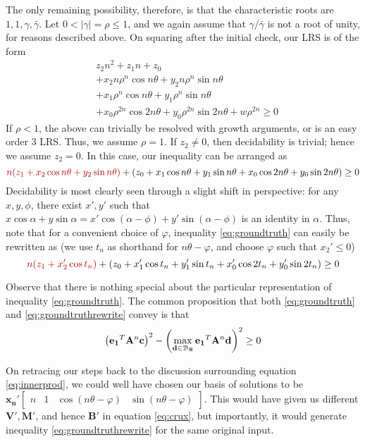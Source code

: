 The only remaining possibility, therefore, is that the characteristic roots are $1, 1, \gamma, \bar{\gamma}$. Let $0 < |\gamma| = \rho \le 1$, and we again assume that $\gamma/\bar{\gamma}$ is not a root of unity, for reasons described above. On squaring after the initial check, our LRS is of the form
\begin{align*}
&z_2n^2 + z_1n + z_0  \\
&+ x_2 n \rho^n \cos n\theta + y_2 n \rho^n \sin n\theta  \\
&+ x_1\rho^n\cos n\theta + y_1\rho^n\sin n\theta  \\
&+ x_0 \rho^{2n}\cos 2n\theta + y_0 \rho^{2n} \sin 2n\theta + w\rho^{2n} \ge 0
\end{align*}
If $\rho < 1$, the above can trivially be resolved with growth arguments, or is an easy order $3$ LRS. Thus, we assume $\rho = 1$. If $z_2 \ne 0$, then decidability is trivial; hence we assume $z_2 = 0$. In this case, our inequality can be arranged as
\begin{equation}
\label{eq:groundtruth}
{\color{red!70!black} n(z_1 + x_2\cos n\theta + y_2\sin n\theta)} + (z_0 + x_1\cos n\theta + y_1\sin n\theta + x_0\cos 2n\theta + y_0\sin 2n\theta) \ge 0
\end{equation}
Decidability is most clearly seen through a slight shift in perspective: for any $x, y, \phi$, there exist $x', y'$ such that $x\cos \alpha + y\sin\alpha = x'\cos(\alpha - \phi) + y'\sin (\alpha - \phi)$ is an identity in $\alpha$. Thus, note that for a convenient choice of $\varphi$, inequality \ref{eq:groundtruth} can easily be rewritten as (we use $t_n$ as shorthand for $n\theta - \varphi$, and choose $\varphi$ such that $x_2' \le 0$)
\begin{equation}
\label{eq:groundtruthrewrite}
{\color{red!70!black}n(z_1 + x_2' \cos t_n)} + (z_0 + x_1'\cos t_n + y_1'\sin t_n + x_0'\cos 2t_n + y_0'\sin 2t_n) \ge 0
\end{equation}

Observe that there is nothing special about the particular representation of inequality \ref{eq:groundtruth}. The common proposition that both \ref{eq:groundtruth} and \ref{eq:groundtruthrewrite} convey is that 
$$
\left(\mathbf{e_1}^T\mathbf{A}^n\mathbf{c}\right)^2 - \left(\max_{\mathbf{d} \in \mathcal{B}_{\mathbf{S}}} \mathbf{e_1}^T\mathbf{A}^n\mathbf{d}\right)^2 \ge 0
$$

On retracing our steps back to the discussion surrounding equation \ref{eq:innerprod}, we could well have chosen our basis of solutions to be $\mathbf{x_n'}\begin{bmatrix}n & 1 & \cos(n\theta - \varphi) & \sin(n\theta - \varphi) \end{bmatrix}$. This would have given us different $\mathbf{V'}, \mathbf{M'}$, and hence $\mathbf{B'}$ in equation \ref{eq:crux}, but importantly, it would generate inequality \ref{eq:groundtruthrewrite} for the same original input.

